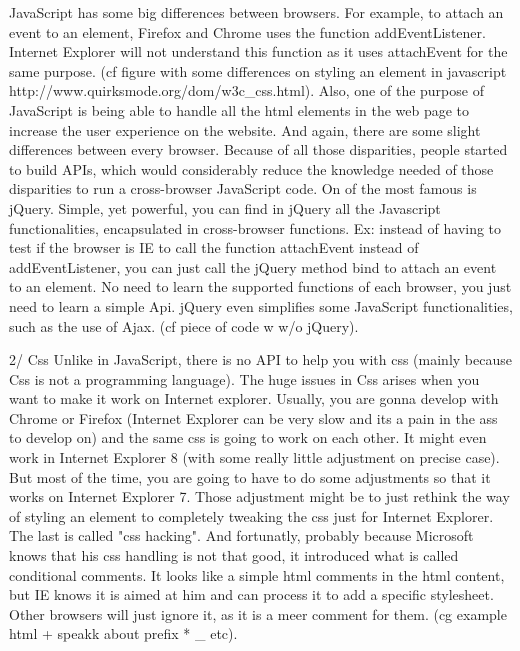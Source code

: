 JavaScript has some big differences between browsers. For example, to attach an event to an element, Firefox and Chrome uses the function addEventListener. Internet Explorer will not understand this function as it uses attachEvent for the same purpose. (cf figure with some differences on styling an element in javascript http://www.quirksmode.org/dom/w3c_css.html).
Also, one of the purpose of JavaScript is being able to handle all the html elements in the web page to increase the user experience on the website. And again, there are some slight differences between every browser.
Because of all those disparities, people started to build APIs, which would considerably reduce the knowledge needed of those disparities to run a cross-browser JavaScript code. On of the most famous is jQuery. Simple, yet powerful, you can find in jQuery all the Javascript functionalities, encapsulated in cross-browser functions. Ex: instead of having to test if the browser is IE to call the function attachEvent instead of addEventListener, you can just call the jQuery method bind to attach an event to an element. No need to learn the supported functions of each browser, you just need to learn a simple Api. jQuery even simplifies some JavaScript functionalities, such as the use of Ajax. (cf piece of code w w/o jQuery).

2/ Css
Unlike in JavaScript, there is no API to help you with css (mainly because Css is not a programming language). The huge issues in Css arises when you want to make it work on Internet explorer. Usually, you are gonna develop with Chrome or Firefox (Internet Explorer can be very slow and its a pain in the ass to develop on) and the same css is going to work on each other. It might even work in Internet Explorer 8 (with some really little adjustment on precise case). But most of the time, you are going to have to do some adjustments so that it works on Internet Explorer 7. Those adjustment might be to just rethink the way of styling an element to completely tweaking the css just for Internet Explorer. The last is called "css hacking". And fortunatly, probably because Microsoft knows that his css handling is not that good, it introduced what is called conditional comments. It looks like a simple html comments in the html content, but IE knows it is aimed at him and can process it to add a specific stylesheet. Other browsers will just ignore it, as it is a meer comment for them. (cg example html + speakk about prefix * _ etc).